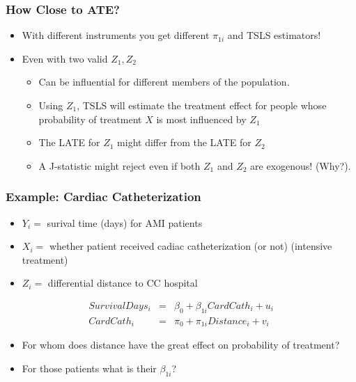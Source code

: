 \documentclass[xcolor=pdftex,dvipsnames,table,mathserif,aspectratio=169]{beamer}
\begin{document}
\begin{frame}
\frametitle{How Close to ATE?}
\begin{itemize}
\item With different instruments you get different $\pi_{1i}$ and TSLS estimators!
\item Even with two valid $Z_1, Z_2$
\begin{itemize}
\item Can be influential for different members of the population.
\item Using $Z_1$, TSLS will estimate the treatment effect for people whose probability of treatment $X$ is most influenced by $Z_1$
\item The LATE for $Z_1$ might differ from the LATE for $Z_2$
\item A J-statistic might reject even if both $Z_1$ and $Z_2$ are exogenous! (Why?).
\end{itemize}
\end{itemize}
\end{frame}


\begin{frame}
\frametitle{Example: Cardiac Catheterization}
\begin{itemize}
\item $Y_i=$ surival time (days) for AMI patients
\item $X_i=$ whether patient received cadiac catheterization (or not) (intensive treatment)
\item $Z_i=$ differential distance to CC hospital
\end{itemize}
\begin{eqnarray*}
SurvivalDays_i &=& \beta_0 + \beta_{1i} CardCath_i + u_i\\
CardCath_i &=& \pi_0 + \pi_{1i} Distance_i + v_i
\end{eqnarray*}
\begin{itemize}
\item For whom does distance have the great effect on probability of treatment?
\item For those patients what is their $\beta_{1i}$?
\end{itemize}
\end{frame}
\end{document}
